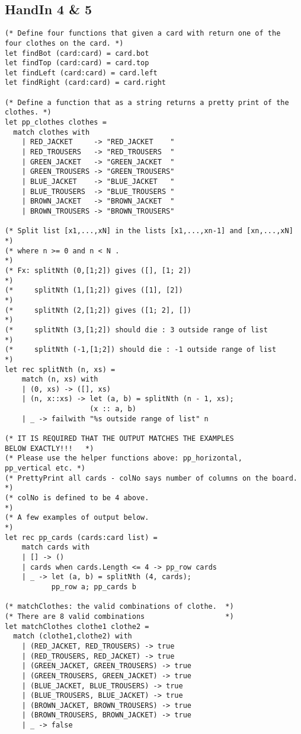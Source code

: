 \subsection{HandIn 4 \& 5}
\label{Appendix_FSharp_Melnyk_4and5}
\begin{lstlisting}
(* Define four functions that given a card with return one of the 
four clothes on the card. *)
let findBot (card:card) = card.bot
let findTop (card:card) = card.top
let findLeft (card:card) = card.left
let findRight (card:card) = card.right

(* Define a function that as a string returns a pretty print of the 
clothes. *)
let pp_clothes clothes =
  match clothes with
    | RED_JACKET     -> "RED_JACKET    "
    | RED_TROUSERS   -> "RED_TROUSERS  "
    | GREEN_JACKET   -> "GREEN_JACKET  "
    | GREEN_TROUSERS -> "GREEN_TROUSERS"
    | BLUE_JACKET    -> "BLUE_JACKET   "
    | BLUE_TROUSERS  -> "BLUE_TROUSERS "
    | BROWN_JACKET   -> "BROWN_JACKET  "
    | BROWN_TROUSERS -> "BROWN_TROUSERS"

(* Split list [x1,...,xN] in the lists [x1,...,xn-1] and [xn,...,xN] *)
(* where n >= 0 and n < N .                                          *)
(* Fx: splitNth (0,[1;2]) gives ([], [1; 2])                         *)
(*     splitNth (1,[1;2]) gives ([1], [2])                           *)
(*     splitNth (2,[1;2]) gives ([1; 2], [])                         *)
(*     splitNth (3,[1;2]) should die : 3 outside range of list       *)
(*     splitNth (-1,[1;2]) should die : -1 outside range of list     *)
let rec splitNth (n, xs) =
    match (n, xs) with
    | (0, xs) -> ([], xs)
    | (n, x::xs) -> let (a, b) = splitNth (n - 1, xs);
                    (x :: a, b) 
    | _ -> failwith "%s outside range of list" n

(* IT IS REQUIRED THAT THE OUTPUT MATCHES THE EXAMPLES 
BELOW EXACTLY!!!   *)
(* Please use the helper functions above: pp_horizontal, 
pp_vertical etc. *)
(* PrettyPrint all cards - colNo says number of columns on the board. *)
(* colNo is defined to be 4 above.                                        *)
(* A few examples of output below.                                        *)
let rec pp_cards (cards:card list) = 
    match cards with
    | [] -> ()
    | cards when cards.Length <= 4 -> pp_row cards
    | _ -> let (a, b) = splitNth (4, cards);
           pp_row a; pp_cards b

(* matchClothes: the valid combinations of clothe.  *)
(* There are 8 valid combinations                   *)
let matchClothes clothe1 clothe2 =
  match (clothe1,clothe2) with
    | (RED_JACKET, RED_TROUSERS) -> true
    | (RED_TROUSERS, RED_JACKET) -> true
    | (GREEN_JACKET, GREEN_TROUSERS) -> true
    | (GREEN_TROUSERS, GREEN_JACKET) -> true
    | (BLUE_JACKET, BLUE_TROUSERS) -> true
    | (BLUE_TROUSERS, BLUE_JACKET) -> true
    | (BROWN_JACKET, BROWN_TROUSERS) -> true
    | (BROWN_TROUSERS, BROWN_JACKET) -> true
    | _ -> false


\end{lstlisting}

